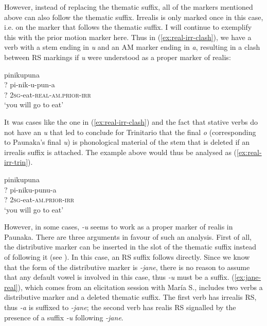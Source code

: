 However, instead of replacing the thematic suffix, all of the markers mentioned above can also follow the thematic suffix. Irrealis is only marked once in this case, i.e. on the marker that follows the thematic suffix. I will continue to exemplify this with the prior motion marker here. Thus in  (\ref{ex:real-irr-clash}), we have a verb with a stem ending in \textit{u} and an AM marker ending in \textit{a}, resulting in a clash between RS markings if \textit{u} were understood as a proper marker of realis:

\ea\label{ex:real-irr-clash}
\begingl 
\glpreamble pinikupuna\\
\gla ? pi-nik-u-pun-a\\ 
\glb ? 2\textsc{sg}-eat-\textsc{real}-\textsc{am.prior}-\textsc{irr}\\ 
\glft ‘you will go to eat’\\ 
\endgl
\xe

It was cases like the one in (\ref{ex:real-irr-clash}) and the fact that stative verbs  do not have an \textit{u} that led \citet[227]{Rose2014} to conclude for Trinitario that the final \textit{o} (corresponding to Paunaka’s final \textit{u}) is phonological material of the stem that is deleted if an irrealis suffix is attached. The example above would thus be analysed as (\ref{ex:real-irr-trin}).

\ea\label{ex:real-irr-trin}
\begingl 
\glpreamble pinikupuna\\
\gla ? pi-niku-punu-a\\ 
\glb ? 2\textsc{sg}-eat-\textsc{am.prior}-\textsc{irr}\\ 
\glft ‘you will go to eat’\\ 
\endgl
\xe
{}

However, in some cases, \textit{-u} seems to work as a proper marker of realis in Paunaka. There are three arguments in favour of such an analysis. First of all, the distributive marker can be inserted in the slot of the thematic suffix instead of following it (see ). In this case, an RS suffix follows directly. Since we know that the form of the distributive marker is \textit{-jane}, there is no reason to assume that any default vowel is involved in this case, thus \textit{-u} must be a suffix. (\ref{ex:jane-real}), which comes from an elicitation session with María S., includes two verbs a distributive marker and a deleted thematic suffix. The first verb has irrealis RS, thus \textit{-a} is suffixed to \textit{-jane}; the second verb has realis RS signalled by the presence of a suffix \textit{-u} following \textit{-jane}.

